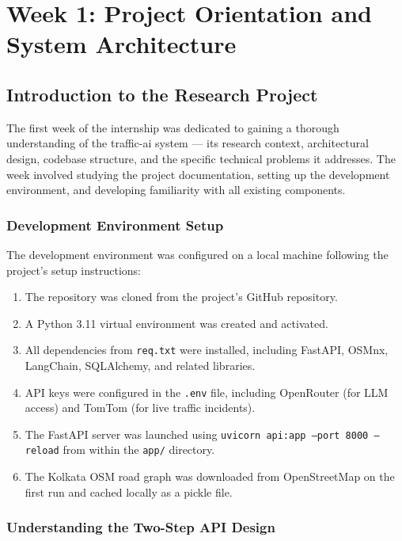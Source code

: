 \documentclass[12pt, a4paper]{report}
\begin{document}
\chapter{Week 1: Project Orientation and System Architecture}
\label{chap:week1}

\section{Introduction to the Research Project}

The first week of the internship was dedicated to gaining a thorough understanding of the traffic-ai system — its research context, architectural design, codebase structure, and the specific technical problems it addresses. The week involved studying the project documentation, setting up the development environment, and developing familiarity with all existing components.

\subsection{Development Environment Setup}

The development environment was configured on a local machine following the project's setup instructions:

\begin{enumerate}
    \item The repository was cloned from the project's GitHub repository.
    \item A Python 3.11 virtual environment was created and activated.
    \item All dependencies from \texttt{req.txt} were installed, including FastAPI, OSMnx, LangChain, SQLAlchemy, and related libraries.
    \item API keys were configured in the \texttt{.env} file, including OpenRouter (for LLM access) and TomTom (for live traffic incidents).
    \item The FastAPI server was launched using \texttt{uvicorn api:app --port 8000 --reload} from within the \texttt{app/} directory.
    \item The Kolkata OSM road graph was downloaded from OpenStreetMap on the first run and cached locally as a pickle file.
\end{enumerate}

\subsection{Understanding the Two-Step API Design}
\end{document}
